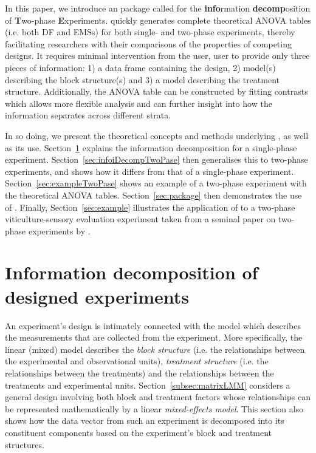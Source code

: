 \documentclass[article]{jss}
\begin{document}
In this paper, we introduce an  package called  for the {\bf info}rmation {\bf decomp}osition of {\bf T}wo-phase {\bf E}xperiments.  quickly generates complete theoretical ANOVA tables (i.e. both DF and EMSs)  for both single- and two-phase experiments, thereby facilitating researchers with their comparisons of the properties of competing designs. It requires minimal intervention from the user, user to provide only three pieces of information: 1) a data frame containing the design, 2) model(s) describing the block structure(s) and 3) a model describing the treatment structure. Additionally, the ANOVA table can be constructed by fitting contrasts which allows more flexible analysis and can further insight into how the information separates across different strata.

In so doing, we present the theoretical concepts and methods underlying , as well as its use. Section~\ref{sec:infoDecomp} explains the information decomposition for a single-phase experiment. Section~\ref{sec:infoiDecompTwoPase} then generalises this to two-phase experiments, and shows how it differs from that of a single-phase experiment. Section~\ref{sec:exampleTwoPase} shows an example of a two-phase experiment with the theoretical ANOVA tables. Section~\ref{sec:package} then demonstrates the use of . Finally, Section~\ref{sec:example} illustrates the application of  to a two-phase viticulture-sensory evaluation experiment taken from a seminal paper on two-phase experiments by \cite{Brien1999}.

\section{Information decomposition of designed experiments} 
\label{sec:infoDecomp}
An experiment's design is intimately connected with the model which describes the measurements that are collected from the experiment. More specifically, the linear (mixed) model describes the \emph{block structure} (i.e. the relationships between the experimental and observational units), \emph{treatment structure} (i.e. the relationships between the treatments) and the relationships between the treatments and experimental units. Section~\ref{subsec:matrixLMM} considers a general design involving both block and treatment factors whose relationships can be represented mathematically by a linear \emph{mixed-effects model}. This section also shows how the data vector from such an experiment is decomposed into its constituent components based on the experiment's block and treatment structures.
\end{document}
